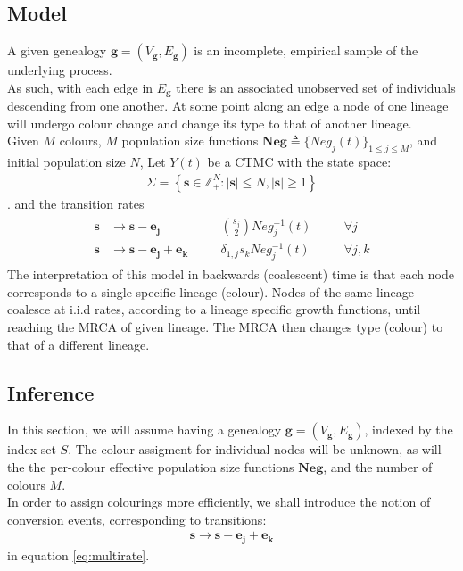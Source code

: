 \documentclass{report}
\newcommand{\Z}{\mathbb{Z}}
\theoremstyle{definition}
\begin{document}
\subsection{Model}
A given genealogy $\mathbf{g}=(V_\mathbf{g}, E_\mathbf{g})$ is an incomplete, empirical sample of the underlying process.\\
As such, with each edge in $E_\mathbf{g}$ there is an associated unobserved set of individuals descending from one another. At some point along an edge a node of one lineage will undergo colour change and change its type to that of another lineage.\\
Given $M$ colours, $M$ population size functions $\mathbf{Neg}\triangleq\{Neg_j(t)\}_{1\leq j\leq M}$, and initial population size $N$, Let $Y(t)$ be a CTMC with the state space:
\begin{gather}
  \Sigma = \left\{\mathbf{s}\in \Z_+^{N}:|\mathbf{s}|\leq N, |\mathbf{s}|\geq1\right\}
\end{gather}.
and the transition rates
\begin{gather}\label{eq:multirate}
\begin{align}
\mathbf{s}&\to\mathbf{s}-\mathbf{e_j} &\quad& \binom{s_j}{2}Neg_j^{-1}(t)&\quad&\forall j\\
\mathbf{s}&\to\mathbf{s}-\mathbf{e_j}+\mathbf{e_k}&\quad& \delta_{1,j}s_kNeg_j^{-1}(t)&\quad&\forall j,k
\end{align}
\end{gather}
The interpretation of this model in backwards (coalescent) time is that each node corresponds to a single specific lineage (colour). Nodes of the same lineage coalesce at i.i.d rates, according to a lineage specific growth functions, until reaching the MRCA of given lineage. The MRCA then changes type (colour) to that of a different lineage. 
\subsection{Inference}
In this section, we will assume having a genealogy $\mathbf{g}=(V_\mathbf{g}, E_\mathbf{g})$, indexed by the index set $S$. The colour assigment for individual nodes will be unknown, as will the the per-colour effective population size functions $\mathbf{Neg}$, and the number of colours $M$.\\

In order to assign colourings more efficiently, we shall introduce the notion of conversion events, corresponding to transitions:
\begin{gather*}
\mathbf{s}\to\mathbf{s}-\mathbf{e_j}+\mathbf{e_k}
\end{gather*}
in equation \ref{eq:multirate}.\\
\end{document}
